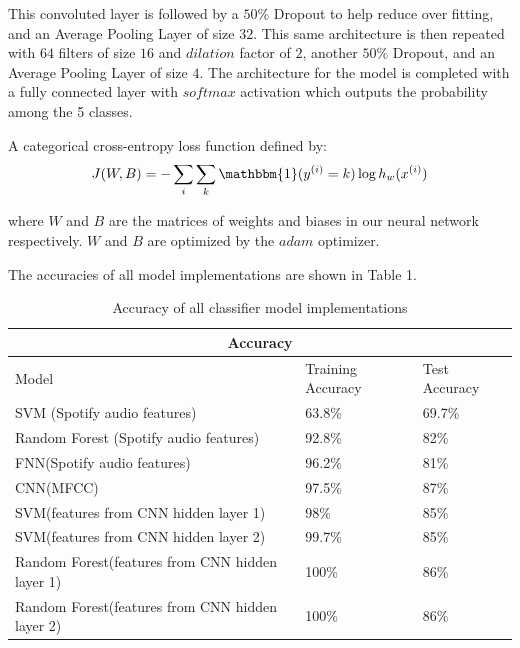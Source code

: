 \documentclass[11.5pt]{article}
\begin{document}
This convoluted layer is followed by a $50\%$ Dropout to help reduce over fitting, and an Average Pooling Layer of size $32$. This same architecture is then repeated with $64$ filters of size $16$ and $dilation$ factor of $2$, another $50\%$ Dropout, and an Average Pooling Layer of size $4$. The architecture for the model is completed with a fully connected layer with $softmax$ activation which outputs the probability among the 5 classes.

A categorical cross-entropy loss function defined by:
\[J(W, B) = -\sum_{i}\sum_{k} \mathbbm{1} (y^{(i)} = k) \log h_{w}(x^{(i)})\]
 
 where $W$ and $B$ are the matrices of weights and biases in our neural network respectively. $W$ and $B$ are optimized by the $adam$ optimizer.

The accuracies of all model implementations are shown in Table 1. 
 \begin{table}[h!]
\centering
 \begin{tabular}{ |p{7.7cm}||p{3cm}|p{3cm} | }
 \hline
 \multicolumn{3}{|c|}{Accuracy} \\
 \hline
 Model                                                                      & Training Accuracy &Test Accuracy\\
 \hline
 SVM (Spotify audio features)                                  & 63.8\%                   &69.7\%          \\
  \hline
 Random Forest (Spotify audio features)                 & 92.8\%                   & 82\%            \\
 \hline
 FNN(Spotify audio features)                                    &96.2\%                   & 81\%            \\
 \hline
 CNN(MFCC)                                                            &97.5\%                   & 87\%            \\
 \hline
 SVM(features from CNN hidden layer 1)                 & 98\%                     & 85\%            \\
 \hline
 SVM(features from CNN hidden layer 2)                 & 99.7\%                  & 85\%            \\
 \hline
 Random Forest(features from CNN hidden layer 1)& 100\%                   & 86\%           \\
 \hline
 Random Forest(features from CNN hidden layer 2)& 100\%                   & 86\%           \\
 \hline
\end{tabular}
\caption{Accuracy of all classifier model implementations}
\label{table:1}
\end{table}
\end{document}
